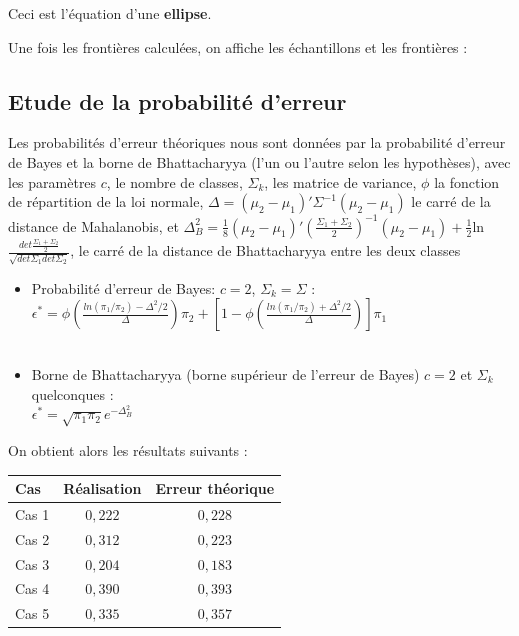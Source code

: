 \documentclass[a4paper,11pt]{article}
\begin{document}
\noindent Ceci est l'équation d'une \textbf{ellipse}.

\noindent Une fois les frontières calculées, on affiche les échantillons et les frontières :


\subsection{Etude de la probabilité d'erreur}

\noindent Les probabilités d'erreur théoriques nous sont données par la probabilité d'erreur de Bayes et la borne de Bhattacharyya (l'un ou l'autre selon les hypothèses), avec les paramètres $c$, le nombre de classes, $\Sigma_k$, les matrice de variance, $\phi$ la fonction de répartition de la loi normale,  $\Delta = (\mu_2 - \mu_1)' \Sigma^{-1}(\mu_2 - \mu_1)$ le carré de la distance de Mahalanobis, et \newline $\Delta_B^2 = \frac{1}{8}(\mu_2 - \mu_1)' \left( \frac{\Sigma_1 + \Sigma_2}{2} \right)^{-1} (\mu_2 - \mu_1) + \frac{1}{2}$ln$\frac{det\frac{\Sigma_1 + \Sigma_2}{2}}{\sqrt{det\Sigma_1 det \Sigma_2}}$, le carré de la distance de Bhattacharyya entre les deux classes \\

\begin{itemize}
\item Probabilité d'erreur de Bayes:  $c=2$, $\Sigma_k = \Sigma$ : \\ 
$\displaystyle \epsilon^{*} = \phi \left( \frac{ ln( \pi_1 /  \pi_2) - \Delta^2/2 } {\Delta}\right) \pi_2 + \left[ 1 - \phi \left( \frac{ln(\pi_1/\pi_2) + \Delta^2/2}{\Delta} \right) \right] \pi_1$ \\ \\ 
\item Borne de  Bhattacharyya (borne supérieur de l'erreur de Bayes) $c=2$ et $\Sigma_k$ quelconques  : \\ 
$\epsilon^* = \sqrt{\pi_1 \pi_2} e^{-\Delta_B^2} $ \\
\end{itemize}

\noindent On obtient alors les résultats suivants :

\begin{center}
\begin{tabular}{|l|c|c|}
\hline
Cas & Réalisation & Erreur théorique  \\
\hline
Cas 1 & $0,222$ & $0,228$  \\
Cas 2 & $0,312$ & $0,223$ \\
Cas 3 & $0,204$ & $0,183$ \\
Cas 4 & $0,390$ & $0,393$ \\
Cas 5 & $0,335$ & $0,357$ \\ 
\hline
\end{tabular}
\end{center}
\\ \\
\end{document}

